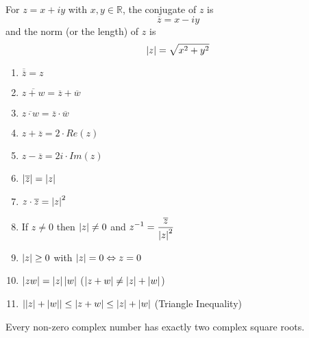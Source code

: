 \begin{defn}
For $z = x + iy$ with $x,y\in\mathbb{R}$, the conjugate of $z$ is \[\overline{z} = x -iy\] and the norm (or the length) of $z$ is \[\left| z \right| = \sqrt{x^2+y^2}\]
\end{defn}

\begin{thm}
    \begin{enumerate}
        \item $\overline{\overline{z}} = z$
        \item $\overline{z+w} = \overline{z}+\overline{w}$
        \item $\overline{z\cdot w} = \overline{z} \cdot \overline{w}$
        \item $z + \overline{z} = 2 \cdot Re(z)$
        \item $z - \overline{z} = 2 i \cdot Im(z)$
        \item $\left| \overline{z} \right| = \left| z \right|$
        \item $z \cdot \overline{z} = \left| z \right|^2$
        \item If $z \neq 0$ then $\left| z \right| \neq 0$ and $\displaystyle z^{-1} = \frac{\overline{z}}{\left| z \right|^2}$
        \item $\left| z \right| \geq 0$ with $\left| z \right| = 0 \Leftrightarrow z = 0$
        \item $\left| zw \right| = \left| z \right|\left| w \right|$ ($\left| z+w \right| \neq \left| z \right|+\left| w \right|$)
        \item $\left| \left| z \right|+\left| w \right| \right| \leq \left| z+w \right| \leq \left| z \right| + \left| w \right|$ (Triangle Inequality)
    \end{enumerate}
\end{thm}

\begin{thm}
    Every non-zero complex number has exactly two complex square roots.
\end{thm}

